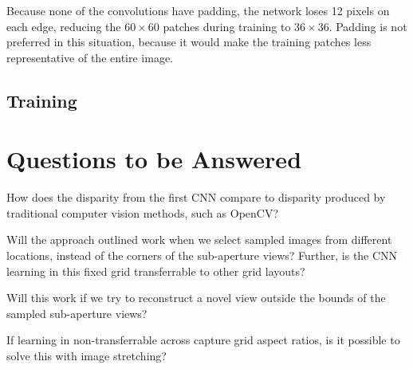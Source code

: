 \documentclass[10pt,twocolumn,letterpaper]{article}
\begin{document}
Because none of the convolutions have padding, the network loses 12 pixels on each edge, reducing
the $60 \times 60$ patches during training to $36 \times 36$. Padding is not preferred in this situation, 
because it would make the training patches less representative of the entire image.


\subsection{Training}

\section{Questions to be Answered}

How does the disparity from the first CNN compare to disparity produced 
by traditional computer vision methods, such as OpenCV?

Will the approach outlined work when we select sampled images from different locations, instead 
of the corners of the sub-aperture views? Further, is the CNN learning in this fixed grid transferrable
to other grid layouts?

Will this work if we try to reconstruct a novel view outside the bounds of the sampled sub-aperture views?

If learning in non-transferrable across capture grid aspect ratios, is it possible to solve this with
image stretching?

{\small


}
\end{document}
